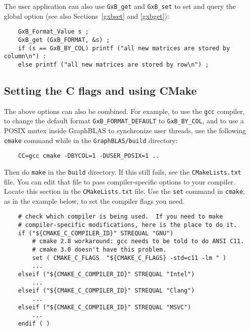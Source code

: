 \documentclass[12pt]{article}
\begin{document}
The user application can also use \verb'GxB_get' and \verb'GxB_set' to set and
query the global option (see also Sections~\ref{gxbset} and \ref{gxbget}):

    {\small
    \begin{verbatim}
    GxB_Format_Value s ;
    GxB_get (GxB_FORMAT, &s) ;
    if (s == GxB_BY_COL) printf ("all new matrices are stored by column\n") :
    else printf ("all new matrices are stored by row\n") ; \end{verbatim} }

\subsection{Setting the C flags and using CMake}

The above options can also be combined.  For example, to use the \verb'gcc'
compiler, to change the default format \verb'GxB_FORMAT_DEFAULT' to
\verb'GxB_BY_COL', and to use a POSIX mutex inside GraphBLAS to synchronize
user threads, use the following \verb'cmake' command while in the
\verb'GraphBLAS/build' directory:

    {\small
    \begin{verbatim}
    CC=gcc cmake -DBYCOL=1 -DUSER_POSIX=1 .. \end{verbatim}}

\noindent
Then do \verb'make' in the \verb'build' directory.  If this still fails, see
the \verb'CMakeLists.txt' file.  You can edit that file to pass
compiler-specific options to your compiler.  Locate this section in the
\verb'CMakeLists.txt' file.  Use the \verb'set' command in \verb'cmake', as in
the example below, to set the compiler flags you need.

    {\small
    \begin{verbatim}
    # check which compiler is being used.  If you need to make
    # compiler-specific modifications, here is the place to do it.
    if ("${CMAKE_C_COMPILER_ID}" STREQUAL "GNU")
        # cmake 2.8 workaround: gcc needs to be told to do ANSI C11.
        # cmake 3.0 doesn't have this problem.
        set ( CMAKE_C_FLAGS  "${CMAKE_C_FLAGS} -std=c11 -lm " )
        ...
    elseif ("${CMAKE_C_COMPILER_ID}" STREQUAL "Intel")
        ...
    elseif ("${CMAKE_C_COMPILER_ID}" STREQUAL "Clang")
        ...
    elseif ("${CMAKE_C_COMPILER_ID}" STREQUAL "MSVC")
        ...
    endif ( )
    \end{verbatim} }
\end{document}
